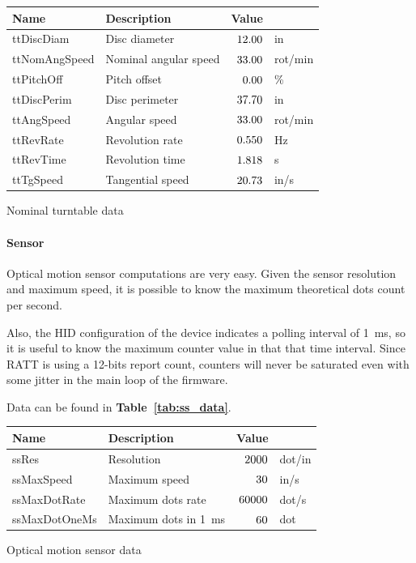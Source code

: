 \documentclass[a4paper,10pt]{article}
\makeatletter
\newenvironment{tablehere}{\def\@captype{table}\vspace{2ex}}{\vspace{2ex}}
\newcommand{\citet}[1]{\textbf{Table~\ref{#1}}}
\makeatother
\begin{document}
\begin{multicols}{2}
\begin{tablehere}
\centering \footnotesize
\begin{tabular}{|l|l|rl|}
\hline
\textbf{Name} & \textbf{Description} & \textbf{Value} &	\\
\hline
ttDiscDiam		& Disc diameter			& $12.00$		& in			\\
ttNomAngSpeed	& Nominal angular speed	& $33.00$	& rot/min		\\
ttPitchOff		& Pitch offset			& $0.00$		& \%			\\
\hline
ttDiscPerim		& Disc perimeter		& $37.70$	& in			\\
ttAngSpeed		& Angular speed			& $33.00$		& rot/min		\\
ttRevRate		& Revolution rate		& $0.550$		& Hz			\\
ttRevTime		& Revolution time		& $1.818$		& s				\\
ttTgSpeed		& Tangential speed		& $20.73$		& in/s			\\
\hline
\end{tabular}
\caption{Nominal turntable data}
\label{tab:tt_data_nom}
\end{tablehere}


\paragraph{Sensor}
Optical motion sensor computations are very easy. Given the sensor resolution
and maximum speed, it is possible to know the maximum theoretical dots count
per second.

Also, the HID configuration of the device indicates a polling interval of
1~ms, so it is useful to know the maximum counter value in that that time
interval. Since RATT is using a 12-bits report count, counters will never be
saturated even with some jitter in the main loop of the firmware.

Data can be found in \citet{tab:ss_data}.

\begin{tablehere}
\centering \footnotesize
\begin{tabular}{|l|l|rl|}
\hline
\textbf{Name} & \textbf{Description} & \textbf{Value} &	\\
\hline
ssRes			& Resolution			& $2000$			& dot/in		\\
ssMaxSpeed		& Maximum speed			& $30$		& in/s			\\
\hline	
ssMaxDotRate	& Maximum dots rate		& $60000$	& dot/s			\\
ssMaxDotOneMs	& Maximum dots in 1~ms	& $60$	& dot			\\
\hline
\end{tabular}
\caption{Optical motion sensor data}
\label{tab:ss_data}
\end{tablehere}



\end{multicols}
\end{document}
